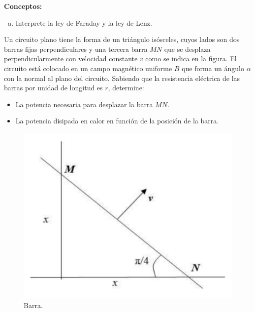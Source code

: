 \begin{mdframed}[style=warning]
	\begin{ejercicio}
		\textbf{Conceptos: }
		\begin{enumerate}[a)]
			\item Interprete la ley de Faraday y la ley de Lenz.
		\end{enumerate}
	\end{ejercicio}
\end{mdframed}











\begin{mdframed}[style=warning]
	\begin{ejercicio}
		Un circuito plano tiene la forma de un triángulo isósceles, cuyos lados son dos barras fijas perpendiculares y una tercera barra $MN$  que se desplaza  perpendicularmente con velocidad constante $v$ como se indica en la figura. El circuito está colocado en un campo magnético uniforme $B$ que forma un ángulo $\alpha$ con la normal al plano del circuito. Sabiendo que la resistencia eléctrica de las barras por unidad de longitud es $r$, determine: 
		\begin{itemize}
			\item La potencia necesaria para desplazar la barra $MN$.
			\item La potencia disipada en calor en función de la posición de la barra.
		\end{itemize}
		\begin{figure}[H]
			\centering
			\includegraphics[scale=0.4]{./img/bar.png}
			\caption{Barra.}
			\label{espiras}	
		\end{figure}
	\end{ejercicio}
\end{mdframed}


















